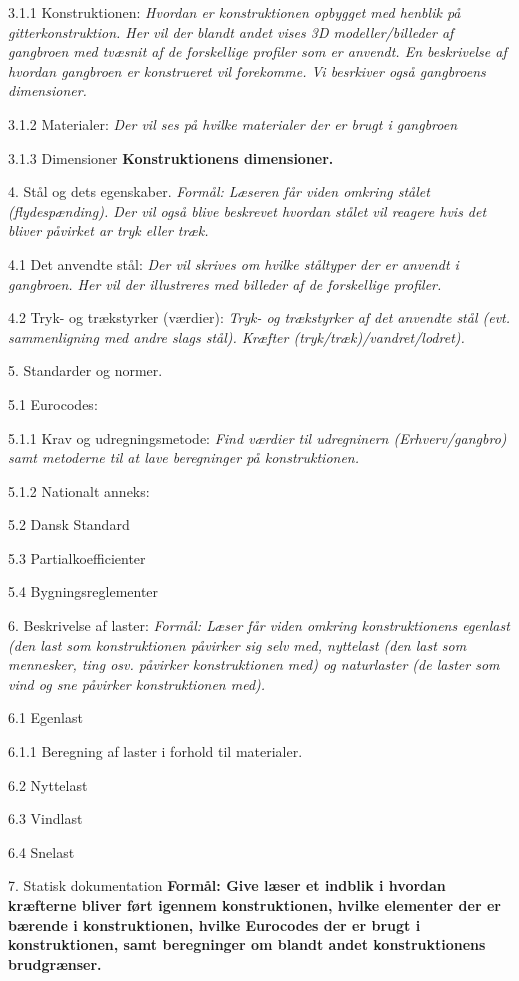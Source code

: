 3.1.1 Konstruktionen: \textit{Hvordan er konstruktionen opbygget med henblik på gitterkonstruktion. Her vil der blandt andet vises 3D modeller/billeder af gangbroen med tvæsnit af de forskellige profiler som er anvendt. En beskrivelse af hvordan gangbroen er konstrueret vil forekomme. Vi besrkiver også gangbroens dimensioner.}

3.1.2 Materialer: \textit{Der vil ses på hvilke materialer der er brugt i gangbroen}

3.1.3 Dimensioner \textbf{Konstruktionens dimensioner.}


4. Stål og dets egenskaber. \textit{Formål: Læseren får viden omkring stålet (flydespænding). Der vil også blive beskrevet hvordan stålet vil reagere hvis det bliver påvirket ar tryk eller træk.}

4.1 Det anvendte stål: \textit{Der vil skrives om hvilke ståltyper der er anvendt i gangbroen. Her vil der illustreres med billeder af de forskellige profiler.}

4.2 Tryk- og trækstyrker (værdier): \textit{Tryk- og trækstyrker af det anvendte stål (evt. sammenligning med andre slags stål). Kræfter (tryk/træk)/vandret/lodret).}


5. Standarder og normer.

5.1 Eurocodes:

5.1.1 Krav og udregningsmetode: \textit{Find værdier til udregninern (Erhverv/gangbro) samt metoderne til at lave beregninger på konstruktionen.}

5.1.2 Nationalt anneks:

5.2 Dansk Standard

5.3 Partialkoefficienter

5.4 Bygningsreglementer


6. Beskrivelse af laster: \textit{Formål: Læser får viden omkring konstruktionens egenlast (den last som konstruktionen påvirker sig selv med, nyttelast (den last som mennesker, ting osv. påvirker konstruktionen med) og naturlaster (de laster som vind og sne påvirker konstruktionen med).}

6.1 Egenlast

6.1.1 Beregning af laster i forhold til materialer.

6.2 Nyttelast

6.3 Vindlast

6.4 Snelast


7. Statisk dokumentation \textbf{Formål: Give læser et indblik i hvordan kræfterne bliver ført igennem konstruktionen, hvilke elementer der er bærende i konstruktionen, hvilke Eurocodes der er brugt i konstruktionen, samt beregninger om blandt andet konstruktionens brudgrænser.}

